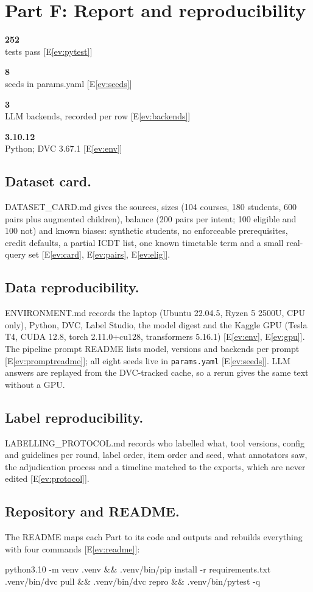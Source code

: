 \documentclass[11pt,a4paper]{article}
\newcommand{\kn}[2]{\begin{minipage}[t]{0.185\linewidth}\centering
  {\LARGE\bfseries\color{accent}#1}\\[1pt]{\footnotesize\setstretch{0.95}\color{black!75}#2}\end{minipage}}
\newcounter{ev}
\newcommand{\ev}[1]{E\ref{ev:#1}}
\begin{document}
\section{Part F: Report and reproducibility}
\begin{keybox}
\kn{252}{tests pass [\ev{pytest}]}\hfill
\kn{8}{seeds in params.yaml [\ev{seeds}]}\hfill
\kn{3}{LLM backends, recorded per row [\ev{backends}]}\hfill
\kn{3.10.12}{Python; DVC 3.67.1 [\ev{env}]}
\end{keybox}

\subsection{Dataset card.}
DATASET\_CARD.md gives the sources, sizes (104 courses, 180 students, 600 pairs plus augmented children), balance
(200 pairs per intent; 100 eligible and 100 not) and known biases: synthetic students, no enforceable prerequisites,
credit defaults, a partial ICDT list, one known timetable term and a small real-query set [\ev{card}, \ev{pairs},
\ev{elig}].

\subsection{Data reproducibility.}
ENVIRONMENT.md records the laptop (Ubuntu 22.04.5, Ryzen 5 2500U, CPU only), Python, DVC, Label Studio, the model
digest and the Kaggle GPU (Tesla T4, CUDA 12.8, torch 2.11.0+cu128, transformers 5.16.1) [\ev{env}, \ev{gpu}]. The
pipeline prompt README lists model, versions and backends per prompt [\ev{promptreadme}]; all eight seeds live in
\texttt{params.yaml} [\ev{seeds}]. LLM answers are replayed from the DVC-tracked cache, so a rerun gives the same
text without a GPU.

\subsection{Label reproducibility.}
LABELLING\_PROTOCOL.md records who labelled what, tool versions, config and guidelines per round, label order, item
order and seed, what annotators saw, the adjudication process and a timeline matched to the exports, which are never
edited [\ev{protocol}].

\subsection{Repository and README.}
The README maps each Part to its code and outputs and rebuilds everything with four commands [\ev{readme}]:
\begin{tcolorbox}[colback=black!4,colframe=black!4,boxrule=0pt,arc=2pt,left=6pt,top=2pt,bottom=2pt,before skip=3pt,after skip=3pt]
\small\ttfamily{}
python3.10 -m venv .venv \&\& .venv/bin/pip install -r requirements.txt\\
.venv/bin/dvc pull \&\& .venv/bin/dvc repro \&\& .venv/bin/pytest -q
\end{tcolorbox}
\end{document}
